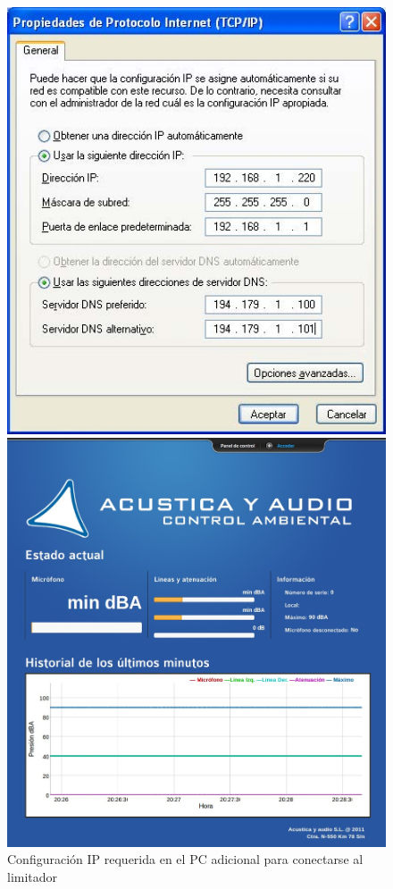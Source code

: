 \begin{figure}[ht]
    \begin{minipage}[b]{.45\textwidth}
        \centering
        \includegraphics[width=1\textwidth]{imagenes/lms_ip.jpg}
        \caption{Configuración \acrshort{IP} requerida  en el \acrshort{PC} adicional para conectarse al limitador}
        \label{img:lms_ip}
    \end{minipage}
    \hfill
    \begin{minipage}[b]{.45\textwidth}
        \centering
        \includegraphics[width=1\textwidth]{imagenes/lms_ui.jpg}

\end{minipage}
\end{figure}
